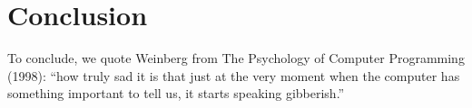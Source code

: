 \newcommand{\discussionSection}{Conclusion}
\section{\protect\discussionSection} %
\label{sec:discussion}
To conclude, we quote Weinberg from The Psychology of Computer Programming (1998): ``how truly sad it is that just at the very moment
when the computer has something important to tell us, it starts
speaking gibberish.''










